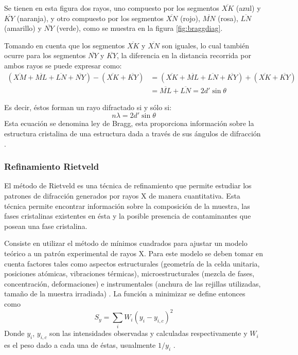 \documentclass[../main.tex]{subfiles}
\begin{document}
Se tienen en esta figura dos rayos, uno compuesto por los segmentos $\overline{XK}$ (azul) y $\overline{KY}$ (naranja), y otro compuesto por los segmentos $\overline{XN}$ (rojo), $\overline{MN}$ (rosa), $\overline{LN}$ (amarillo) y $\overline{NY}$ (verde), como se muestra en la figura \ref{fig:braggdiag}.

Tomando en cuenta que los segmentos $\overline{XK}$ y $\overline{XN}$ son iguales, lo cual también ocurre para los segmentos $\overline{NY}$ y $\overline{KY}$, la diferencia en la distancia recorrida por ambos rayos se puede expresar como:
\begin{equation}
    \begin{split}
        (\overline{XM}+\overline{ML}+\overline{LN}+\overline{NY})-(\overline{XK}+\overline{KY})&=(\overline{XK}+\overline{ML}+\overline{LN}+\overline{KY})+(\overline{XK}+\overline{KY})\\
        &=\overline{ML}+\overline{LN}=2d'\sin{\theta}
    \end{split}
    \label{eq:rayosbragg}
\end{equation}

Es decir, éstos forman un rayo difractado si y sólo si:
\begin{equation}
    n\lambda=2d'\sin{\theta}
    \label{eq:leydebragg}
\end{equation}
Esta ecuación se denomina ley de Bragg, esta proporciona información sobre la estructura cristalina de una estructura dada a través de sus ángulos de difracción \cite{Cullity2014}.
\subsubsection{Refinamiento Rietveld}
El método de Rietveld es una técnica de refinamiento que permite estudiar los patrones de difracción generados por rayos X de manera cuantitativa. Esta técnica permite encontrar información sobre la composición de la muestra, las fases cristalinas existentes en ésta y la posible presencia de contaminantes que posean una fase cristalina.

Consiste en utilizar el método de mínimos cuadrados para ajustar un modelo teórico a un patrón experimental de rayos X. Para este modelo se deben tomar en cuenta factores tales como aspectos estructurales (geometría de la celda unitaria, posiciones atómicas, vibraciones térmicas), microestructurales (mezcla de fases, concentración, deformaciones) e instrumentales (anchura de las rejillas utilizadas, tamaño de la muestra irradiada) \cite{Rietveld}. La función a minimizar se define entonces como
\begin{equation}
    S_y=\sum_i W_i\left(y_{i}-y_{i,c}\right)^2
    \label{eq:minimcuad}
\end{equation}
Donde $y_{i}$, $y_{i,c}$ son las intensidades observadas y calculadas respectivamente y $W_i$ es el peso dado a cada una de éstas, usualmente $1/y_i$ \cite{Fuentes2004}.
\end{document}
